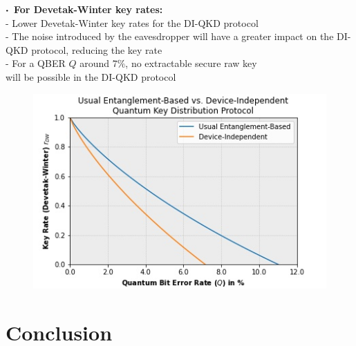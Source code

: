 \documentclass{beamer}
\newcommand\sbullet[1][.5]{\mathbin{\vcenter{\hbox{\scalebox{#1}{$\bullet$}}}}}
\begin{document}
\begin{frame}
\begin{minipage}{0.5\textwidth}
\begin{figure}
            \end{figure}
        \end{minipage}%
        \begin{minipage}{0.5\textwidth}
            \centering
            \vspace{0.5ex}
            \scriptsize $\sbullet$\, \textbf{For Devetak-Winter key rates:}\\
            \vspace{0.25ex}
            \tiny
            - Lower Devetak-Winter key rates for the DI-QKD protocol\\
            - The noise introduced by the eavesdropper will have a greater impact on the DI-QKD protocol, reducing the key rate\\
            - For a QBER $Q$ around $7\%$, no extractable secure raw key\\ will be possible in the DI-QKD protocol
            \vspace{-1.2ex}
            \begin{figure}
                \includegraphics[width=\linewidth]{figures/presentation/jpg/key-rates-bounds-quantum-bit-error-rate-plot.jpg}
                \vspace{-4ex}
                \caption{\color{blue}{Figure 3: }\color{black}{Devetak-Winter key rates with respect to QBER $Q$}}
            \end{figure}
        \end{minipage}
        
    \end{frame}


    \section{Conclusion}
\end{document}
